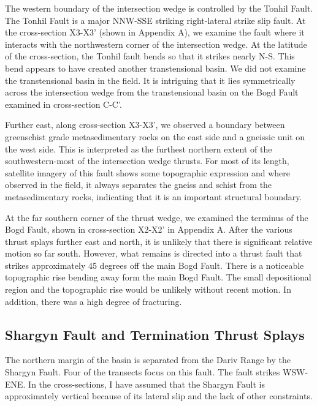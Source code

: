 The western boundary of the intersection wedge is controlled by the Tonhil Fault. The Tonhil Fault is a major NNW-SSE striking right-lateral strike slip fault. At the cross-section X3-X3' (shown in Appendix A), we examine the fault where it interacts with the northwestern corner of the intersection wedge. At the latitude of the cross-section, the Tonhil fault bends so that it strikes nearly N-S. This bend appears to have created another transtensional basin. We did not examine the transtensional basin in the field. It is intriguing that it lies symmetrically across the intersection wedge from the transtensional basin on the Bogd Fault examined in cross-section C-C'. 

Further east, along cross-section X3-X3', we observed a boundary between greenschist grade metasedimentary rocks on the east side and a gneissic unit on the west side. This is interpreted as the furthest northern extent of the southwestern-most of the intersection wedge thrusts. For most of its length, satellite imagery of this fault shows some topographic expression and where observed in the field, it always separates the gneiss and schist from the metasedimentary rocks, indicating that it is an important structural boundary. 

At the far southern corner of the thrust wedge, we examined the terminus of the Bogd Fault, shown in cross-section X2-X2' in Appendix A. After the various thrust splays further east and north, it is unlikely that there is significant relative motion so far south. However, what remains is directed into a thrust fault that strikes approximately 45 degrees off the main Bogd Fault. There is a noticeable topographic rise bending away form the main Bogd Fault. The small depositional region and the topographic rise would be unlikely without recent motion. In addition, there was a high degree of fracturing.

\subsection{Shargyn Fault and Termination Thrust Splays}

The northern margin of the basin is separated from the Dariv Range by the Shargyn Fault. Four of the transects focus on this fault. The fault strikes WSW-ENE. In the cross-sections, I have assumed that the Shargyn Fault is approximately vertical because of its lateral slip and the lack of other constraints. 

